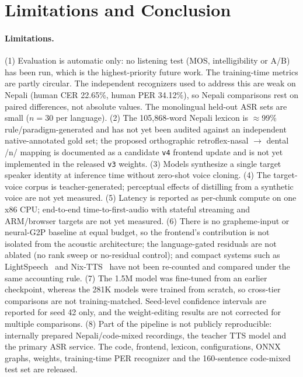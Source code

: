 \section{Limitations and Conclusion}
\label{sec:conclusion}

\paragraph{Limitations.}
(1) Evaluation is automatic only: no listening test (MOS, intelligibility or A/B) has been run, which is the highest-priority future work. The training-time metrics are partly circular. The independent recognizers used to address this are weak on Nepali (human CER 22.65\%, human PER 34.12\%), so Nepali comparisons rest on paired differences, not absolute values. The monolingual held-out ASR sets are small ($n=30$ per language).
(2) The 105,868-word Nepali lexicon is $\approx$99\% rule/paradigm-generated and has not yet been audited against an independent native-annotated gold set; the proposed orthographic retroflex-nasal $\rightarrow$ dental /n/ mapping is documented as a candidate \texttt{v4} frontend update and is not yet implemented in the released \texttt{v3} weights.
(3) Models synthesize a single target speaker identity at inference time without zero-shot voice cloning.
(4) The target-voice corpus is teacher-generated; perceptual effects of distilling from a synthetic voice are not yet measured.
(5) Latency is reported as per-chunk compute on one x86 CPU; end-to-end time-to-first-audio with stateful streaming and ARM/browser targets are not yet measured.
(6) There is no grapheme-input or neural-G2P baseline at equal budget, so the frontend's contribution is not isolated from the acoustic architecture; the language-gated residuals are not ablated (no rank sweep or no-residual control); and compact systems such as LightSpeech~\cite{luo2021lightspeech} and Nix-TTS~\cite{chevi2022nixtts} have not been re-counted and compared under the same accounting rule.
(7) The 1.5M model was fine-tuned from an earlier checkpoint, whereas the 281K models were trained from scratch, so cross-tier comparisons are not training-matched. Seed-level confidence intervals are reported for seed 42 only, and the weight-editing results are not corrected for multiple comparisons.
(8) Part of the pipeline is not publicly reproducible: internally prepared Nepali/code-mixed recordings, the teacher TTS model and the primary ASR service. The code, frontend, lexicon, configurations, ONNX graphs, weights, training-time PER recognizer and the 160-sentence code-mixed test set are released.

